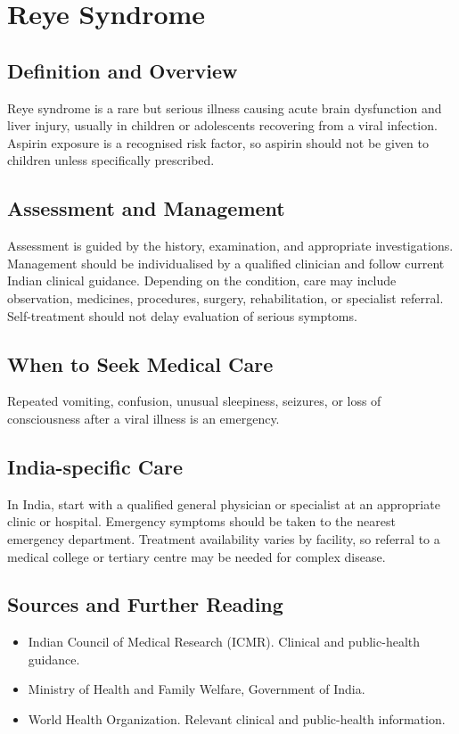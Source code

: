 \chapter{Reye Syndrome}

\section*{Definition and Overview}
Reye syndrome is a rare but serious illness causing acute brain dysfunction and liver injury, usually in children or adolescents recovering from a viral infection. Aspirin exposure is a recognised risk factor, so aspirin should not be given to children unless specifically prescribed.

\section*{Assessment and Management}
Assessment is guided by the history, examination, and appropriate investigations. Management should be individualised by a qualified clinician and follow current Indian clinical guidance. Depending on the condition, care may include observation, medicines, procedures, surgery, rehabilitation, or specialist referral. Self-treatment should not delay evaluation of serious symptoms.

\section*{When to Seek Medical Care}
Repeated vomiting, confusion, unusual sleepiness, seizures, or loss of consciousness after a viral illness is an emergency.

\section*{India-specific Care}
In India, start with a qualified general physician or specialist at an appropriate clinic or hospital. Emergency symptoms should be taken to the nearest emergency department. Treatment availability varies by facility, so referral to a medical college or tertiary centre may be needed for complex disease.

\section*{Sources and Further Reading}
\begin{itemize}
    \item Indian Council of Medical Research (ICMR). Clinical and public-health guidance.
    \item Ministry of Health and Family Welfare, Government of India.
    \item World Health Organization. Relevant clinical and public-health information.
\end{itemize}

